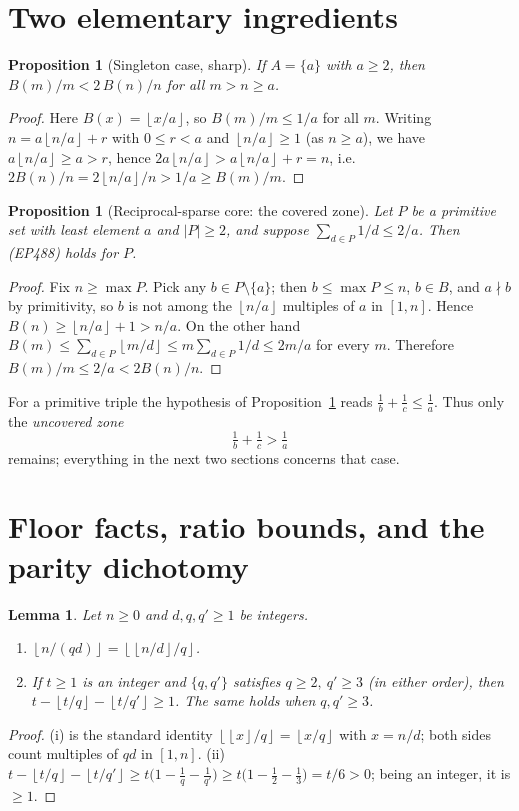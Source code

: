 \documentclass[11pt]{article}
\newtheorem{proposition}[theorem]{Proposition}
\newtheorem{lemma}[theorem]{Lemma}
\theoremstyle{remark}
\newcommand{\floor}[1]{\left\lfloor #1 \right\rfloor}
\begin{document}
\section{Two elementary ingredients}

\begin{proposition}[Singleton case, sharp]\label{prop:singleton}
If $A=\{a\}$ with $a\ge 2$, then $B(m)/m<2\,B(n)/n$ for all $m>n\ge a$.
\end{proposition}
\begin{proof}
Here $B(x)=\floor{x/a}$, so $B(m)/m\le 1/a$ for all $m$. Writing
$n=a\floor{n/a}+r$ with $0\le r<a$ and $\floor{n/a}\ge 1$ (as $n\ge a$), we have
$a\floor{n/a}\ge a>r$, hence $2a\floor{n/a}>a\floor{n/a}+r=n$, i.e.
$2B(n)/n=2\floor{n/a}/n>1/a\ge B(m)/m$.
\end{proof}

\begin{proposition}[Reciprocal-sparse core: the covered zone]\label{prop:sparse}
Let $P$ be a primitive set with least element $a$ and $|P|\ge 2$, and suppose
$\sum_{d\in P}1/d\le 2/a$. Then (EP488) holds for $P$.
\end{proposition}
\begin{proof}
Fix $n\ge\max P$. Pick any $b\in P\setminus\{a\}$; then $b\le\max P\le n$, $b\in
B$, and $a\nmid b$ by primitivity, so $b$ is not among the $\floor{n/a}$ multiples
of $a$ in $[1,n]$. Hence $B(n)\ge\floor{n/a}+1>n/a$. On the other hand
$B(m)\le\sum_{d\in P}\floor{m/d}\le m\sum_{d\in P}1/d\le 2m/a$ for every $m$.
Therefore $B(m)/m\le 2/a<2B(n)/n$.
\end{proof}

For a primitive triple the hypothesis of Proposition~\ref{prop:sparse} reads
$\tfrac1b+\tfrac1c\le\tfrac1a$. Thus only the \emph{uncovered zone}
\begin{equation}\label{eq:uncovered}
  \tfrac1b+\tfrac1c>\tfrac1a
\end{equation}
remains; everything in the next two sections concerns that case.

\section{Floor facts, ratio bounds, and the parity dichotomy}

\begin{lemma}\label{lem:floor}
Let $n\ge 0$ and $d,q,q'\ge 1$ be integers.
\begin{enumerate}[label=\textup{(\roman*)}]
\item $\floor{n/(qd)}=\floor{\floor{n/d}/q}$.
\item If $t\ge 1$ is an integer and $\{q,q'\}$ satisfies $q\ge 2,\ q'\ge 3$ (in
either order), then $t-\floor{t/q}-\floor{t/q'}\ge 1$. The same holds when
$q,q'\ge 3$.
\end{enumerate}
\end{lemma}
\begin{proof}
(i) is the standard identity $\floor{\floor{x}/q}=\floor{x/q}$ with $x=n/d$; both
sides count multiples of $qd$ in $[1,n]$.
(ii) $t-\floor{t/q}-\floor{t/q'}\ge t\bigl(1-\tfrac1q-\tfrac1{q'}\bigr)\ge
t\bigl(1-\tfrac12-\tfrac13\bigr)=t/6>0$; being an integer, it is $\ge 1$.
\end{proof}
\end{document}
